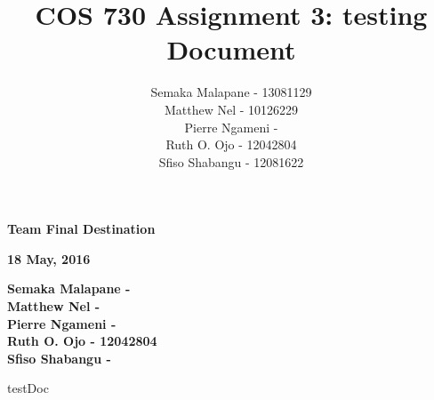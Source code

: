 \documentclass[a4paper]{article}
\title{COS 730 Assignment 3: testing Document}
\author{Semaka Malapane -  13081129 \\
		Matthew Nel -  10126229\\
		Pierre Ngameni -  \\
		Ruth O. Ojo - 12042804 \\
		Sfiso Shabangu - 12081622 }
\begin{document}
	


\begin{titlepage}
    \begin{center}
        \vspace*{1.5cm}        
        \Huge
        \textbf{Team Final Destination}

        \vspace{1.5cm}        
        \large
        \textbf{18 May, 2016}
        
        \vspace{1.0cm}
        
		\large       
	        \textbf{Semaka Malapane -  }\\
			\textbf{Matthew Nel - } \\
			\textbf{Pierre Ngameni -  }\\
			\textbf{Ruth O. Ojo - 12042804 }\\
			\textbf{Sfiso Shabangu - }        
        
        
    \end{center}
\end{titlepage}


\pagebreak
\tableofcontents
\pagebreak

{testDoc}



\end{document}
